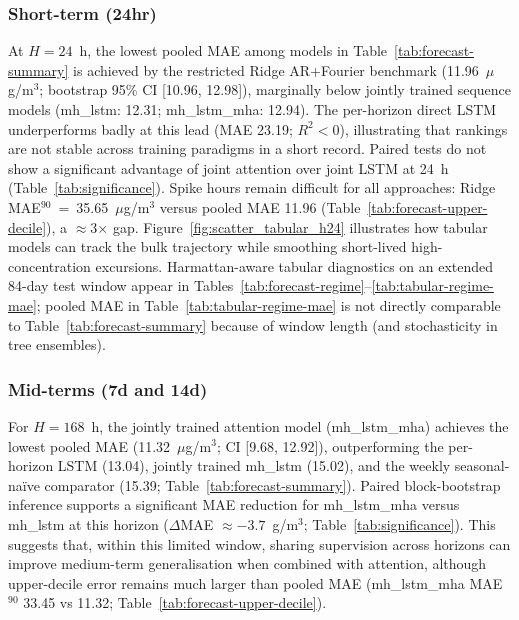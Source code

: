 \documentclass[a4paper,fleqn]{cas-sc}
\begin{document}
\subsubsection{Short-term (24hr)}\label{sec:res24}
At $H=24$~h, the lowest pooled MAE among models in Table~\ref{tab:forecast-summary} is achieved by the restricted Ridge AR+Fourier benchmark (11.96~$\mu$g/m$^3$; bootstrap 95\% CI [10.96, 12.98]), marginally below jointly trained sequence models (mh\_lstm: 12.31; mh\_lstm\_mha: 12.94). The per-horizon direct LSTM underperforms badly at this lead (MAE 23.19; $R^2<0$), illustrating that rankings are not stable across training paradigms in a short record. Paired tests do not show a significant advantage of joint attention over joint LSTM at 24~h (Table~\ref{tab:significance}). Spike hours remain difficult for all approaches: Ridge MAE$^{90}$~=~35.65~$\mu$g/m$^3$ versus pooled MAE 11.96 (Table~\ref{tab:forecast-upper-decile}), a $\approx$3$\times$ gap. Figure~\ref{fig:scatter_tabular_h24} illustrates how tabular models can track the bulk trajectory while smoothing short-lived high-concentration excursions. Harmattan-aware tabular diagnostics on an extended 84-day test window appear in Tables~\ref{tab:forecast-regime}--\ref{tab:tabular-regime-mae}; pooled MAE in Table~\ref{tab:tabular-regime-mae} is not directly comparable to Table~\ref{tab:forecast-summary} because of window length (and stochasticity in tree ensembles).

\subsubsection{Mid-terms (7d and 14d)}\label{sec:res714}
For $H=168$~h, the jointly trained attention model (mh\_lstm\_mha) achieves the lowest pooled MAE (11.32~$\mu$g/m$^3$; CI [9.68, 12.92]), outperforming the per-horizon LSTM (13.04), jointly trained mh\_lstm (15.02), and the weekly seasonal-na\"{i}ve comparator (15.39; Table~\ref{tab:forecast-summary}). Paired block-bootstrap inference supports a significant MAE reduction for mh\_lstm\_mha versus mh\_lstm at this horizon ($\Delta$MAE $\approx -3.7$~\textmu g/m$^3$; Table~\ref{tab:significance}). This suggests that, within this limited window, sharing supervision across horizons can improve medium-term generalisation when combined with attention, although upper-decile error remains much larger than pooled MAE (mh\_lstm\_mha MAE$^{90}$ 33.45 vs 11.32; Table~\ref{tab:forecast-upper-decile}).
\end{document}
